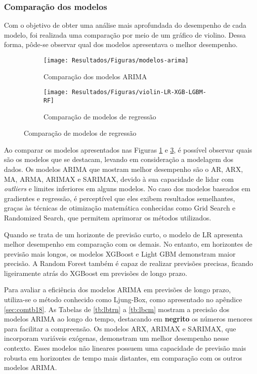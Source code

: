 \subsubsection{Compara\c c\~ao dos modelos}

Com o objetivo de obter uma análise mais aprofundada do desempenho de cada modelo, foi realizada uma comparação por meio de um gráfico de violino. Dessa forma, pôde-se observar qual dos modelos apresentava o melhor desempenho.


\begin{figure}[!htb]
	\centering
	\caption{Análise comparativa dos modelos utilizando gráficos de violino}
	\begin{subfigure}{0.9\textwidth}
		\texttt{[image: Resultados/Figuras/modelos-arima]}
		\caption{Comparação dos modelos ARIMA}
		\label{fig:modelos-arima}
	\end{subfigure}
	
	\begin{subfigure}{0.9\textwidth}
		\texttt{[image: Resultados/Figuras/violin-LR-XGB-LGBM-RF]}
		\caption{Comparação de modelos de regressão}
		\label{fig:violin-lr-xgb-lgbm-rf}
	\end{subfigure}
	
\end{figure}

Ao comparar os modelos apresentados nas Figuras \ref{fig:modelos-arima} e \ref{fig:violin-lr-xgb-lgbm-rf}, é possível observar quais são os modelos que se destacam, levando em consideração a modelagem dos dados. Os modelos ARIMA que mostram melhor desempenho são o AR, ARX, MA, ARMA, ARIMAX e SARIMAX, devido à sua capacidade de lidar com \textit{outliers} e limites inferiores em alguns modelos. No caso dos modelos baseados em gradientes e regressão, é perceptível que eles exibem resultados semelhantes, graças às técnicas de otimização matemática conhecidas como Grid Search e Randomized Search, que permitem aprimorar os métodos utilizados.

Quando se trata de um horizonte de previsão curto, o modelo de LR apresenta melhor desempenho em comparação com os demais. No entanto, em horizontes de previsão mais longos, os modelos XGBoost e Light GBM demonstram maior precisão. A Random Forest também é capaz de realizar previsões precisas, ficando ligeiramente atrás do XGBoost em previsões de longo prazo.

Para avaliar a eficiência dos modelos ARIMA em previsões de longo prazo, utiliza-se o método conhecido como Ljung-Box, como apresentado no apêndice \ref{sec:comtb18}. As Tabelas de \ref{tb:lbtrn} a \ref{tb:lbcm} mostram a precisão dos modelos ARIMA ao longo do tempo, destacando em \textbf{negrito} os números menores para facilitar a compreensão. Os modelos ARX, ARIMAX e SARIMAX, que incorporam variáveis exógenas, demonstram um melhor desempenho nesse contexto. Esses modelos não lineares possuem uma capacidade de previsão mais robusta em horizontes de tempo mais distantes, em comparação com os outros modelos ARIMA.
